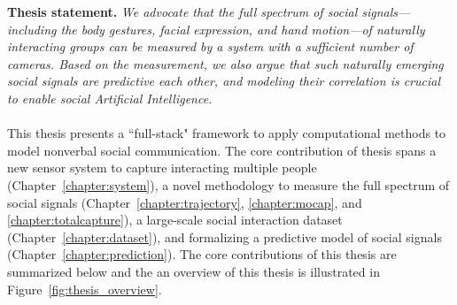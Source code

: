 \noindent \textbf{Thesis statement.}
\emph{We advocate that the full spectrum of social signals---including the body gestures, facial expression, and hand motion---of naturally interacting groups can be measured by a system with a sufficient number of cameras. Based on the measurement, we also argue that such naturally emerging social signals are predictive each other, and modeling their correlation is crucial to enable social Artificial Intelligence.}\\
\mbox{ }\\
\indent This thesis presents a ``full-stack" framework to apply computational methods to model nonverbal social communication. The core contribution of thesis spans a new sensor system to capture interacting multiple people (Chapter~\ref{chapter:system}), a novel methodology to measure the full spectrum of social signals (Chapter~\ref{chapter:trajectory}, \ref{chapter:mocap}, and  \ref{chapter:totalcapture}), a large-scale social interaction dataset (Chapter~\ref{chapter:dataset}), and formalizing a predictive model of social signals (Chapter~\ref{chapter:prediction}). The core contributions of this thesis are summarized below and the an overview of this thesis is illustrated in Figure~\ref{fig:thesis_overview}.
%
%
%
%
%

